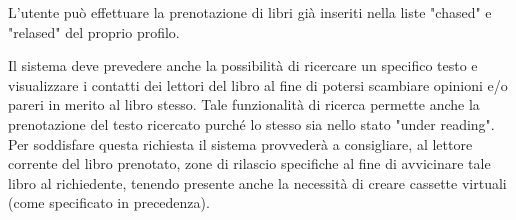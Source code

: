L'utente può effettuare la prenotazione di libri già inseriti nella liste "chased" e "relased" del proprio profilo.


Il sistema deve prevedere anche la possibilità di ricercare un specifico testo e visualizzare i contatti dei
lettori del libro al fine di potersi scambiare opinioni e/o pareri in merito al libro stesso.
Tale funzionalità di ricerca permette anche la prenotazione del testo ricercato purché lo stesso sia nello
stato "under reading".
Per soddisfare questa richiesta il sistema provvederà a consigliare, al lettore corrente 
del libro prenotato, zone di rilascio specifiche al fine di avvicinare tale libro al richiedente, tenendo presente anche la necessità di creare cassette virtuali (come specificato in precedenza).